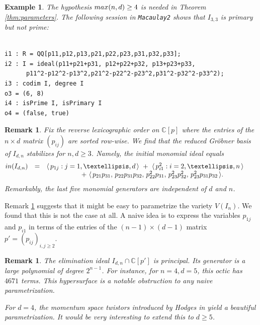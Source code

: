 \documentclass[english]{ourlematema}
\numberwithin{theorem}{section}
\newtheorem{remark}[theorem]{Remark}
\newtheorem{example}[theorem]{Example}
\theoremstyle{definition}
\newcommand{\CC}{\mathbb{C}}
\begin{document}
\begin{example}
The hypothesis ${\rm max}(n,d) \ge 4$ 
is needed in Theorem \ref{thm:parameters}.
The following session in {\tt Macaulay2} \cite{M2} shows that
$I_{3,3}$ is primary but not prime:
\begin{verbatim}

i1 : R = QQ[p11,p12,p13,p21,p22,p23,p31,p32,p33];
i2 : I = ideal(p11+p21+p31, p12+p22+p32, p13+p23+p33,
      p11^2-p12^2-p13^2,p21^2-p22^2-p23^2,p31^2-p32^2-p33^2);
i3 : codim I, degree I
o3 = (6, 8)
i4 : isPrime I, isPrimary I
o4 = (false, true)
\end{verbatim}
\end{example}

\begin{remark} \label{rmk:GBsimple}
Fix the reverse lexicographic order on $\CC[p]$ where
the entries of the $n \times d$ matrix $(p_{ij})$ are sorted row-wise.
We find that the
reduced  Gr\"obner basis of $I_{d,n}$ 
stabilizes for $n,d \geq 3$. Namely,
the initial monomial ideal equals
$$ \begin{matrix} {\rm in}(I_{d,n}) & = &
\langle \,p_{1j} : j=1,\ldots,d \,\rangle \,\,+ \,\,
\langle \,p_{i1}^2 : i = 2,\ldots,n \,\rangle \qquad \\
 & &  \, + \, \,\langle\,
p_{21}p_{31}, \,
p_{22} p_{31} p_{32}, \,
p_{22}^2 p_{31},\, p_{23}^2p_{32}^2,\,
 p_{23}^2 p_{31} p_{32} \,\rangle.
 \end{matrix}
$$
Remarkably, the last five monomial generators
are independent of $d$ and $n$.
\end{remark}

Remark \ref{rmk:GBsimple} suggests that it might be
easy to parametrize the variety $V(I_n)$. We found that
this is not the case at all. A naive idea is to express
the variables $p_{1j}$ and $ p_{i1}$ in terms of the
entries of the $(n-1) \times (d-1)$ matrix $p' = (p_{ij})_{i,j \geq 2}$.

\begin{remark} \label{rmk:Elimhard}
The elimination ideal $I_{d,n} \cap \CC[p']$ is principal.
Its generator is a large polynomial of degree $2^{n-1}$.
For instance, for $n=4,d=5$, this octic has $4671$ terms.
This hypersurface is a notable obstruction to any
naive parametrization.

For $d=4$, the momentum space twistors introduced by Hodges in \cite{Hod}
yield a beautiful parametrization. It would be very interesting to
extend this to $d \geq 5$.
\end{remark}
\end{document}
